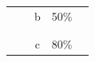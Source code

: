 \begin{table}[H]
\begin{tabular*}{\columnwidth}{@{\extracolsep{\fill}}clcrl}
                                           &                                                                                                            & b          & 50\%             &                                                                                                                                                                                                                                                                                                                                                                                                                                                                           \\
                                           &                                                                                                            &            &                  &                                                                                                                                                                                                                                                                                                                                                                                                                                                                           \\
                                           &                                                                                                            &            &                  &                                                                                                                                                                                                                                                                                                                                                                                                                                                                           \\
                                           &                                                                                                            & c          & 80\%             &                                                                                                                                                                                                                                                                                                                                                                                                                                                                           \\

\end{tabular*}
\end{table}
